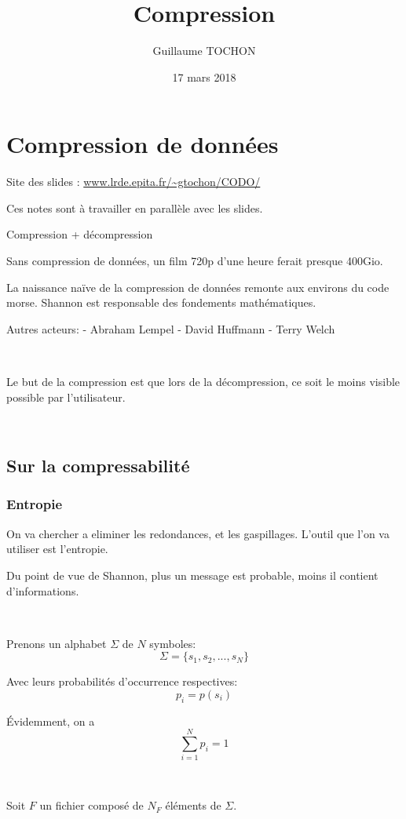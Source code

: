\documentclass[a4paper,11pt]{article}
\title{Compression}
\author{Guillaume TOCHON}
\date{17 mars 2018}
\begin{document}
\maketitle
\tableofcontents

\section{Compression de données}

Site des slides : \url{www.lrde.epita.fr/~gtochon/CODO/}

Ces notes sont à travailler en parallèle avec les slides.

Compression + décompression

Sans compression de données, un film 720p d'une heure ferait presque 400Gio.

La naissance naïve de la compression de données remonte aux environs du code
morse.
Shannon est responsable des fondements mathématiques.

Autres acteurs:
  - Abraham Lempel
  - David Huffmann
  - Terry Welch

\

Le but de la compression est que lors de la décompression, ce soit le moins
visible possible par l'utilisateur.

\

\subsection{Sur la compressabilité}

\subsubsection{Entropie}

On va chercher a eliminer les redondances, et les gaspillages.
L'outil que l'on va utiliser est l'entropie.

Du point de vue de Shannon, plus un message est probable, moins il contient
d'informations.

\

Prenons un alphabet $\Sigma$ de $N$ symboles:
$$ \Sigma = \{s_1,s_2, ..., s_N\} $$

Avec leurs probabilités d'occurrence respectives:
$$ p_i = p(s_i) $$

Évidemment, on a
$$ \sum_{i = 1}^{N} p_i = 1$$

\

Soit $F$ un fichier composé de $N_F$ éléments de $ \Sigma $.
\end{document}
